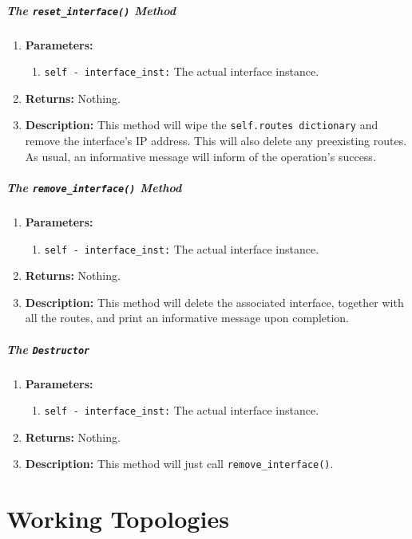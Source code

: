                     \subparagraph{The \texttt{reset\_interface()} Method}
                        \begin{enumerate}
                            \item \textbf{Parameters:}
                            \begin{enumerate}
                                \item \texttt{self - interface\_inst:} The actual interface instance.
                            \end{enumerate}
                            \item \textbf{Returns:} Nothing.
                            \item \textbf{Description:} This method will wipe the \texttt{self.routes dictionary} and remove the interface's IP address. This will also delete any preexisting routes. As usual, an informative message will inform of the operation's success.
                        \end{enumerate}

                    \subparagraph{The \texttt{remove\_interface()} Method}
                        \begin{enumerate}
                            \item \textbf{Parameters:}
                            \begin{enumerate}
                                \item \texttt{self - interface\_inst:} The actual interface instance.
                            \end{enumerate}
                            \item \textbf{Returns:} Nothing.
                            \item \textbf{Description:} This method will delete the associated interface, together with all the routes, and print an informative message upon completion.
                        \end{enumerate}

                    \subparagraph{The \texttt{Destructor}}
                        \begin{enumerate}
                            \item \textbf{Parameters:}
                            \begin{enumerate}
                                \item \texttt{self - interface\_inst:} The actual interface instance.
                            \end{enumerate}
                            \item \textbf{Returns:} Nothing.
                            \item \textbf{Description:} This method will just call \texttt{remove\_interface()}.
                        \end{enumerate}

    \section{Working Topologies}
